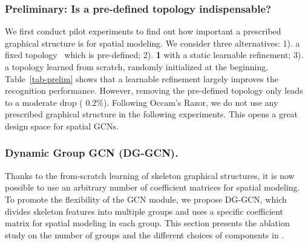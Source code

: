 \vspace{-3mm}
\subsubsection{Preliminary: Is a pre-defined topology indispensable? }
We first conduct pilot experiments to find out how important a prescribed graphical structure is for spatial modeling. 
We consider three alternatives: 1). a fixed topology~\cite{shi2019two} which is pre-defined; 2). \textbf{1} with a static learnable refinement; 
3). a topology learned from scratch, randomly initialized at the beginning.
Table~\ref{tab-prelim} shows that a learnable refinement largely improves the recognition performance. 
However, removing the pre-defined topology only leads to a moderate drop ( 0.2\%). 
Following Occam's Razor, we do not use any prescribed graphical structure in the following experiments.
This opens a great design space for spatial GCNs.

\vspace{-3mm}
\subsubsection{Dynamic Group GCN (DG-GCN). } 
Thanks to the from-scratch learning of skeleton graphical structures, it is now possible to use an arbitrary number of coefficient matrices for spatial modeling. 
To promote the flexibility of the GCN module, we propose DG-GCN, which divides skeleton features into multiple groups and uses a specific coefficient matrix  for spatial modeling in each group. 
This section presents the ablation study on the number of groups and the different choices of components in .  

